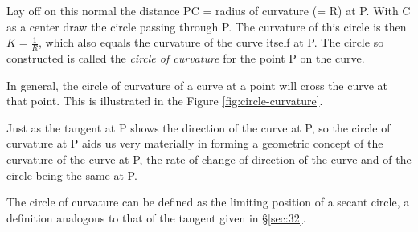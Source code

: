 Lay off on this normal the distance 
PC = radius of curvature (= R) at P. With C as a center draw 
the circle passing through P. The curvature of this circle is then
$K = \frac{1}{R}$, which also equals the curvature of the curve 
itself at P. The circle so constructed is called the 
{\it circle of curvature} for the point P on the curve.

In general, the circle of curvature of a curve at a point 
will cross the curve at that point. This is illustrated in the 
Figure \ref{fig:circle-curvature}.

Just as the tangent at P shows the direction of the curve at P, 
so the circle of curvature at P aids us very materially in 
forming a geometric concept of the curvature of the curve 
at P, the rate of change of direction of the curve and of 
the circle being the same at P.

The circle of curvature can be 
defined as the limiting position of a secant circle, a 
definition analogous to that of the tangent given in 
\S \ref{sec:32}. %


